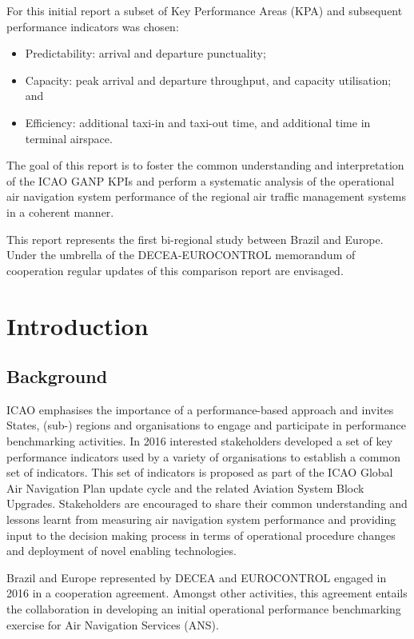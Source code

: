 \documentclass[
]{book}
\providecommand{\tightlist}{%
  \setlength{\itemsep}{0pt}\setlength{\parskip}{0pt}}
\begin{document}
For this initial report a subset of Key Performance Areas (KPA) and subsequent performance indicators was chosen:

\begin{itemize}
\tightlist
\item
  Predictability: arrival and departure punctuality;
\item
  Capacity: peak arrival and departure throughput, and capacity utilisation; and
\item
  Efficiency: additional taxi-in and taxi-out time, and additional time in terminal airspace.
\end{itemize}

The goal of this report is to foster the common understanding and interpretation of the ICAO GANP KPIs and perform a systematic analysis of the operational air navigation system performance of the regional air traffic management systems in a coherent manner.

This report represents the first bi-regional study between Brazil and Europe.
Under the umbrella of the DECEA-EUROCONTROL memorandum of cooperation regular updates of this comparison report are envisaged.

\hypertarget{introduction}{%
\chapter{Introduction}\label{introduction}}

\hypertarget{background}{%
\section{Background}\label{background}}

ICAO emphasises the importance of a performance-based approach and invites States, (sub-) regions and organisations to engage and participate in performance benchmarking activities. In 2016 interested stakeholders developed a set of key performance indicators used by a variety of organisations to establish a common set of indicators.
This set of indicators is proposed as part of the ICAO Global Air Navigation Plan update cycle and the related Aviation System Block Upgrades. Stakeholders are encouraged to share their common understanding and lessons learnt from measuring air navigation system performance and providing input to the decision making process in terms of operational procedure changes and deployment of novel enabling technologies.

Brazil and Europe represented by DECEA and EUROCONTROL engaged in 2016 in a cooperation agreement. Amongst other activities, this agreement entails the collaboration in developing an initial operational performance benchmarking exercise for Air Navigation Services (ANS).
\end{document}
